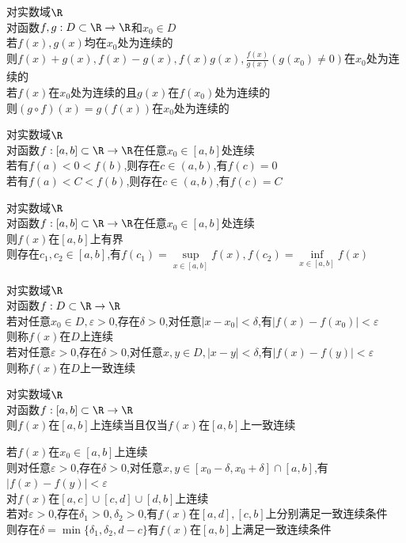 \begin{dingli}
对实数域$\R$\\
对函数$f,g:D\subset \R \to \R$和$x_0\in D$\\
若$f(x),g(x)$均在$x_0$处为连续的\\
则$f(x)+g(x),f(x)-g(x),f(x)g(x),\frac{f(x)}{g(x)}(g(x_0)\neq 0)$在$x_0$处为连续的\\
若$f(x)$在$x_0$处为连续的且$g(x)$在$f(x_0)$处为连续的\\
则$(g\circ f)(x)=g(f(x))$在$x_0$处为连续的
\end{dingli}

\begin{dingli}
对实数域$\R$\\
对函数$f:[a,b]\subset \R \to \R$在任意$x_0\in [a,b]$处连续\\
若有$f(a)<0<f(b)$,则存在$c\in (a,b)$,有$f(c)=0$\\
若有$f(a)<C<f(b)$,则存在$c\in (a,b)$,有$f(c)=C$
\end{dingli}

\begin{dingli}
对实数域$\R$\\
对函数$f:[a,b]\subset \R \to \R$在任意$x_0\in [a,b]$处连续\\
则$f(x)$在$[a,b]$上有界\\
则存在$c_1,c_2\in [a,b]$,有$f(c_1)=\sup\limits_{x\in[a,b]}f(x),f(c_2)=\inf\limits_{x\in[a,b]}f(x)$
\end{dingli}

\begin{dingyi}
对实数域$\R$\\
对函数$f:D\subset \R \to \R$\\
若对任意$x_0\in D,\varepsilon>0$,存在$\delta>0$,对任意$|x-x_0|<\delta$,有$|f(x)-f(x_0)|<\varepsilon$\\
则称$f(x)$在$D$上连续\\
若对任意$\varepsilon>0$,存在$\delta>0$,对任意$x,y\in D,|x-y|<\delta$,有$|f(x)-f(y)|<\varepsilon$\\
则称$f(x)$在$D$上一致连续
\end{dingyi}

\begin{dingli}
对实数域$\R$\\
对函数$f:[a,b]\subset \R \to \R$\\
则$f(x)$在$[a,b]$上连续当且仅当$f(x)$在$[a,b]$上一致连续
\end{dingli}

\begin{zhu}
若$f(x)$在$x_0\in [a,b]$上连续\\
则对任意$\varepsilon>0$,存在$\delta>0$,对任意$x,y\in[x_0-\delta,x_0+\delta]\cap[a,b]$,有$|f(x)-f(y)|<\varepsilon$\\
对$f(x)$在$[a,c]\cup[c,d]\cup[d,b]$上连续\\
若对$\varepsilon>0$,存在$\delta_1>0,\delta_2>0$,有$f(x)$在$[a,d],[c,b]$上分别满足一致连续条件\\
则存在$\delta=\min\{\delta_1,\delta_2,d-c\}$有$f(x)$在$[a,b]$上满足一致连续条件
\end{zhu}

